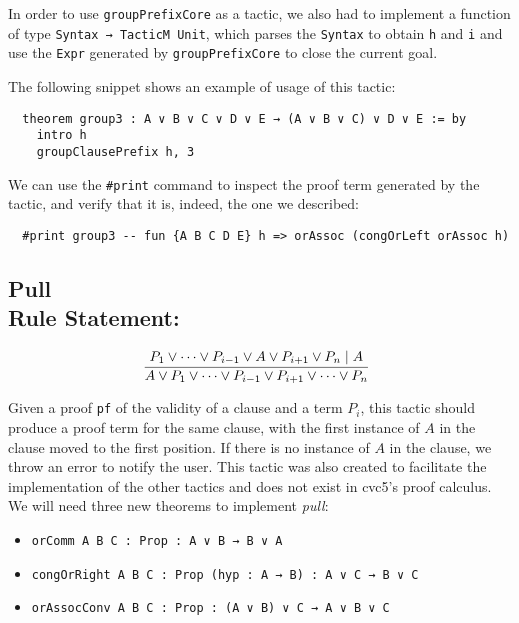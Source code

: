 In order to use \texttt{groupPrefixCore} as a tactic, we also had to implement
a function of type \texttt{Syntax → TacticM Unit}, which parses the \texttt{Syntax}
to obtain \texttt{h} and \texttt{i} and use the \texttt{Expr} generated by
\texttt{groupPrefixCore} to close the current goal.

The following snippet shows an example of usage of this tactic:

\begin{verbatim}
  theorem group3 : A ∨ B ∨ C ∨ D ∨ E → (A ∨ B ∨ C) ∨ D ∨ E := by
    intro h
    groupClausePrefix h, 3
\end{verbatim}

We can use the \texttt{\#print} command to inspect the proof term generated by the tactic, and
verify that it is, indeed, the one we described:

\begin{verbatim}
  #print group3 -- fun {A B C D E} h => orAssoc (congOrLeft orAssoc h)
\end{verbatim}


\subsection*{Pull\\\normalsize{Rule Statement:}}
\[
  \infer[]{A \vee P_{1} \vee \cdots \vee P_{i - 1} \vee P_{i + 1} \vee \cdots \vee P_{n}}{P_{1} \vee \cdots \vee P_{i - 1} \vee A \vee P_{i + 1} \vee P_{n} \mid A}
\]

Given a proof \texttt{pf} of the validity of a clause and a term $P_{i}$, this tactic should produce a proof term for the same clause,
with the first instance of $A$ in the clause moved to the first position. If there is no instance of $A$ in the clause, we throw an error
to notify the user. This tactic was also created to facilitate the implementation
of the other tactics and does not exist in cvc5's proof calculus. We will need three new theorems to implement \textit{pull}:

\begin{itemize}
  \item \texttt{orComm {A B C : Prop} : A ∨ B → B ∨ A}
  \item \texttt{congOrRight {A B C : Prop} (hyp : A → B) : A ∨ C → B ∨ C}
  \item \texttt{orAssocConv {A B C : Prop} : (A ∨ B) ∨ C → A ∨ B ∨ C}
\end{itemize}

